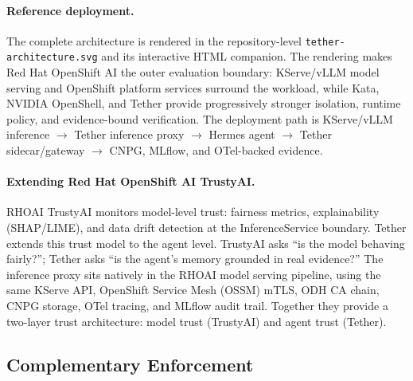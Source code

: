 \documentclass[sigplan,screen,nonacm]{acmart}
\begin{document}
\paragraph{Reference deployment.}
The complete architecture is rendered in the repository-level
\texttt{tether-architecture.svg} and its interactive HTML companion. The
rendering makes Red Hat OpenShift AI the outer evaluation boundary: KServe/vLLM
model serving and OpenShift platform services surround the workload, while
Kata, NVIDIA OpenShell, and Tether provide progressively stronger isolation,
runtime policy, and evidence-bound verification. The deployment path is
KServe/vLLM inference \(\to\) Tether inference proxy \(\to\) Hermes agent
\(\to\) Tether sidecar/gateway \(\to\) CNPG, MLflow, and OTel-backed evidence.

\paragraph{Extending Red Hat OpenShift AI TrustyAI.}
RHOAI TrustyAI monitors model-level trust: fairness metrics, explainability
(SHAP/LIME), and data drift detection at the InferenceService boundary.
Tether extends this trust model to the agent level. TrustyAI asks ``is the
model behaving fairly?''; Tether asks ``is the agent's memory grounded in
real evidence?'' The inference proxy sits natively in the RHOAI model serving
pipeline, using the same KServe API, OpenShift Service Mesh (OSSM) mTLS,
ODH CA chain, CNPG storage, OTel tracing, and MLflow audit trail. Together
they provide a two-layer trust architecture: model trust (TrustyAI) and
agent trust (Tether).

\subsection{Complementary Enforcement}
\end{document}

